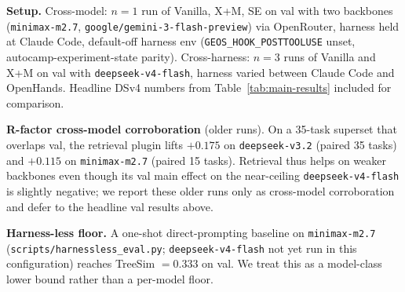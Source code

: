 \documentclass{article}
\begin{document}
\textbf{Setup.} Cross-model: $n=1$ run of Vanilla, X+M, SE on val with two backbones (\texttt{minimax-m2.7}, \texttt{google/gemini-3-flash-preview}) via OpenRouter, harness held at Claude Code, default-off harness env (\texttt{GEOS\_HOOK\_POSTTOOLUSE} unset, autocamp-experiment-state parity). Cross-harness: $n=3$ runs of Vanilla and X+M on val with \texttt{deepseek-v4-flash}, harness varied between Claude Code and OpenHands. Headline DSv4 numbers from Table~\ref{tab:main-results} included for comparison.

\begin{table}[h]
  \caption{Full cross-model and cross-harness panel. Counts in parentheses are task failures out of 17.}
  \label{tab:cross-cutting-full}
  \centering
  \small
\end{table}

\textbf{R-factor cross-model corroboration} (older runs). On a 35-task superset that overlaps val, the retrieval plugin lifts $+0.175$ on \texttt{deepseek-v3.2} (paired 35 tasks) and $+0.115$ on \texttt{minimax-m2.7} (paired 15 tasks). Retrieval thus helps on weaker backbones even though its val main effect on the near-ceiling \texttt{deepseek-v4-flash} is slightly negative; we report these older runs only as cross-model corroboration and defer to the headline val results above.

\textbf{Harness-less floor.} A one-shot direct-prompting baseline on \texttt{minimax-m2.7} (\texttt{scripts/harnessless\_eval.py}; \texttt{deepseek-v4-flash} not yet run in this configuration) reaches TreeSim $= 0.333$ on val. We treat this as a model-class lower bound rather than a per-model floor.
\end{document}
